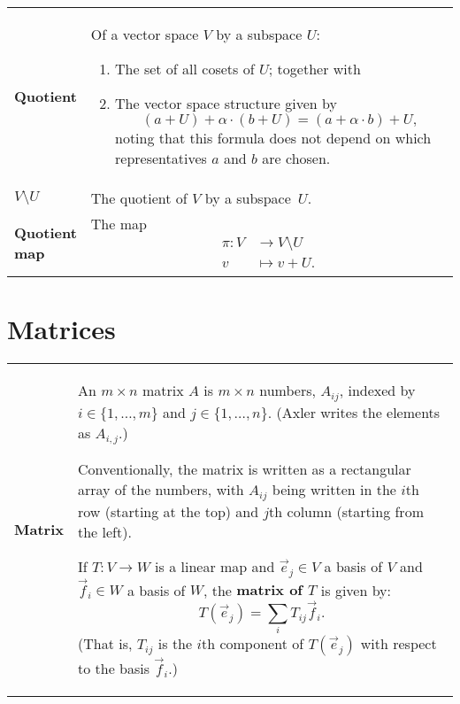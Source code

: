\documentclass[10pt, a4paper, landscape]{article}
\newcommand{\defn}[1]{\textbf{#1}}
\begin{document}
\begin{multicols*}{3}
\begin{tabularx}{\columnwidth}{@{}l>{\raggedright\arraybackslash}X@{}}
  \defn{Quotient} & Of a vector space $V$ by a subspace $U$:
  \begin{enumerate}
  \item The set of all cosets of $U$; together with
  \item The vector space structure given by
    \begin{equation*}
      (a + U) + \alpha\cdot(b + U) = (a+\alpha\cdot b) + U,
    \end{equation*}
    noting that this formula does not depend on which representatives
    $a$ and $b$ are chosen.
  \end{enumerate}
  \\

  \defn{$V\setminus U$} & The quotient of $V$ by a subspace~$U$. \\
  
  \defn{\parbox[t]{0.8in}{\defn{Quotient\\ map}}} & The map
  \begin{equation*}
    \begin{aligned}
      \pi \colon V &\to V\setminus U \\
      v &\mapsto v + U.
      \end{aligned}
  \end{equation*}

  
  
  \\
\end{tabularx}


\section*{Matrices}
\begin{tabularx}{\columnwidth}{@{}l>{\raggedright\arraybackslash}X@{}}
  \toprule
  \defn{Matrix} & An $m\times n$ matrix $A$ is $m\times n$ numbers, $A_{ij}$, indexed by $i\in\{1,\dotsc, m\}$ and $j\in\{1,\dotsc, n\}$. (Axler writes the elements as $A_{i,j}$.)

  Conventionally, the matrix is written as a rectangular array of the
  numbers, with $A_{ij}$ being written in the $i$th row (starting at the
  top) and $j$th column (starting from the left).
  
  If $T\colon V\to W$ is a linear map and $\vec{e}_j\in V$ a basis of $V$ and $\vec{f}_i\in W$ a basis of $W$, the \defn{matrix of $T$} is given by:
  \begin{equation*}
    T(\vec{e}_j) = \sum_i T_{ij} \vec{f}_i.
  \end{equation*}
  (That is, $T_{ij}$ is the $i$th component of $T(\vec{e}_j)$ with respect to the basis $\vec{f}_i$.)
  \\
  

\end{tabularx}
\end{multicols*}
\end{document}
